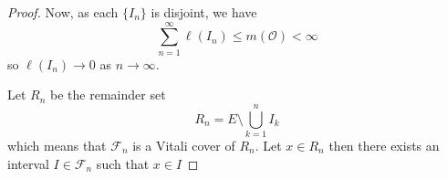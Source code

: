\documentclass[../main.tex]{subfiles}
\begin{document}
\begin{proof}
  Now, as each $\{I_n\}$ is disjoint, we have
  \begin{equation*}
    \sum_{n=1}^{\infty} \ell(I_n) \leq m(\mathcal{O}) < \infty
  \end{equation*}
  so $\ell(I_n) \to 0$ as $n \to \infty$.

  Let $R_n$ be the remainder set
  \begin{equation}
    R_n = E \setminus \bigcup_{k=1}^{n} I_k
  \end{equation}
  which means that $\mathcal{F}_n$ is a Vitali cover of $R_n$. Let $x \in R_n$ then there exists an interval $I \in \mathcal{F}_n$ such that $x \in I$ 
\end{proof}
\end{document}
